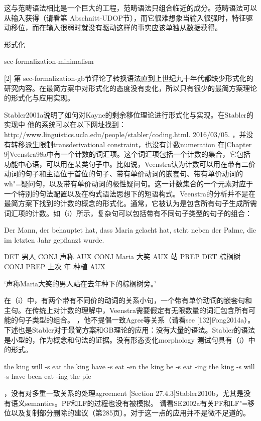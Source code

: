 这与范畴语法相比是一个巨大的工程，范畴语法只组合临近的成分。范畴语法可以从输入获得（请看第 Abschnitt-UDOP节），而它很难想象当输入很强时，特征驱动移位，而在输入很弱时就没有驱动这样的事实应该单独从数据获得。






形式化

sec-formalization-minimalism

[2]
第 sec-formalization-gb节评论了转换语法直到上世纪九十年代都缺少形式化的研究内容。在最简方案中对形式化的态度没有变化，所以只有很少的最简方案理论的形式化与应用实现。




Stabler2001a说明了如何对Kayne的剩余移位理论进行形式化与实现。在Stabler的实现中 
他的系统可以在以下网址找到：
http://www.linguistics.ucla.edu/people/stabler/coding.html. 2016/03/05.
，并没有转移派生限制transderivational constraint，也没有计数numeration 
在[Chapter 9]Veenstra98a中有一个计数的词汇项。这个词汇项包括一个计数的集合，它包括功能中心语，可以用在某类句子中。比如说，Veenstra认为计数可以用在带有二价动词的句子和主语位于首位的句子、带有单价动词的嵌套句、带有单价动词的wh"=疑问句，以及带有单价动词的极性疑问句。这一计数集合的一个元素对应于一个特别的句法配置以及在构式语法思想下的短语构式。Veenstra的分析并不是在最简方案下找到的计数的概念的形式化。通常，它被认为是包含所有句子生成所需词汇项的计数。如（i）所示，复杂句可以包括带有不同句子类型的句子的组合：

Der Mann, der behauptet hat, dass Maria gelacht hat, steht neben der Palme, die im letzten Jahr gepflanzt wurde.

      DET 男人 CONJ 声称 AUX CONJ Maria 大笑 AUX 站 PREP DET 棕榈树 CONJ PREP 上次 年 种植 AUX




`声称Maria大笑的男人站在去年种下的棕榈树旁。'

在（i）中，有两个带有不同价的动词的关系小句，一个带有单价动词的嵌套句和主句。在传统上对计数的理解中，Veenstra需要假定有无限数量的词汇包含所有可能的句子类型的组合。
，他不提倡一致Agree等关系（请看see [132]Fong2014a）。下述也是Stabler对于最简方案和GB理论的应用：没有大量的语法。Stabler的语法是小型的，作为概念和句法的证据。没有形态变化morphology  
测试句具有（i）中的形式。

the king will -s eat
the king have -s eat -en
the king be -s eat -ing
the king -s will -s have been eat -ing the pie

，没有对多重一致关系的处理agreement [Section 27.4.3]Stabler2010b，尤其是没有语义semantics。PF和LF的过程也没有被模拟。 
	请看SE2002a有关PF和LF"=移位以及复制部分删除的建议（第285页）。对于这一点的应用并不是微不足道的。
















